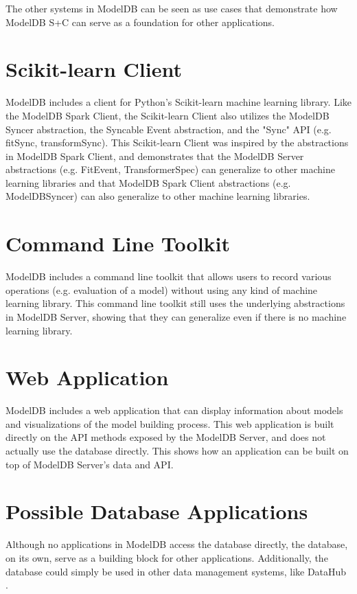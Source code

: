 The other systems in ModelDB can be seen as use cases that demonstrate how ModelDB S+C
can serve as a foundation for other applications.

\section{Scikit-learn Client}
ModelDB includes a client for Python's Scikit-learn machine learning library. Like the
ModelDB Spark Client, the Scikit-learn Client also utilizes the ModelDB Syncer abstraction,
the Syncable Event abstraction, and the "Sync" API (e.g. fitSync, transformSync). This Scikit-learn
Client was inspired by the abstractions in ModelDB Spark Client, and demonstrates that the ModelDB Server
abstractions (e.g. FitEvent, TransformerSpec) can generalize to other machine learning libraries and that
ModelDB Spark Client abstractions (e.g. ModelDBSyncer) can also generalize to other machine learning libraries.

\section{Command Line Toolkit}
ModelDB includes a command line toolkit that allows users to record various operations (e.g.
evaluation of a model) without using any kind of machine learning library. This command line toolkit still
uses the underlying abstractions in ModelDB Server, showing that they can generalize even if there is no machine learning
library.

\section{Web Application}
ModelDB includes a web application that can display information about models and visualizations of
the model building process. This web application is built directly on the API methods exposed by the ModelDB Server,
and does not actually use the database directly. This shows how an application can be built on top of ModelDB Server's 
data and API.

\section{Possible Database Applications}
Although no applications in ModelDB access the database directly, the database, on its own, 
serve as a building block for other applications. Additionally, the database could simply be used in other data management
systems, like DataHub \cite{datahub}.
